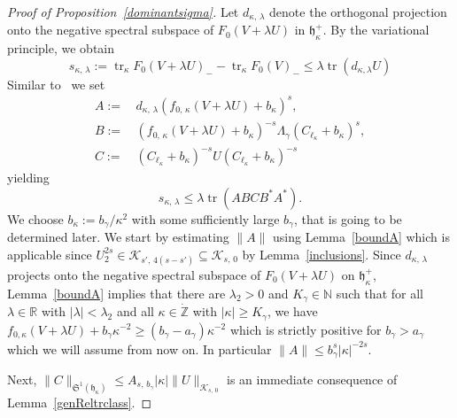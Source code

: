 \documentclass[AHL,Unicode,longabstracts,published]{cedram}
\DeclareMathOperator{\tr}{tr}
\newcommand*\nz{\mathbb{N}}
\newcommand*\gz{\mathbb{Z}}
\newcommand*\rz{\mathbb{R}}
\newcommand*\zp{\dot{\gz}}
\newcommand*\cK{\mathcal{K}}
\newcommand*\gh{\mathfrak{h}}
\newcommand*\gS{\mathfrak{S}}
\newcommand*\ghpk{{\gh^+_\kappa}}
\begin{document}
\begin{proof}[Proof of Proposition~\ref{dominantsigma}]
Let $d_{\kappa,\,\lambda}$ denote the orthogonal projection onto the negative spectral subspace of $F_0(V+\lambda U)$ in $\ghpk$. By the variational principle, we obtain
\begin{equation}
s_{\kappa,\,\lambda} := \tr_\kappa F_0(V+\lambda U)_- - \tr_\kappa F_0(V)_-
\leq \lambda\tr\left(d_{\kappa,\lambda}U\right)
\end{equation}
Similar to~\cite[Equation~(19)]{Iantchenkoetal1996} we set
\begin{equation}
\begin{split}
A :=\,&d_{\kappa,\,\lambda}\left(f_{0,\,\kappa}\left(V+\lambda U\right)+b_\kappa\right)^s,\\
B :=\,&\left(f_{0,\,\kappa}\left(V+\lambda U\right)+b_\kappa\right)^{-s}\Lambda_\gamma\left(C_{\ell_\kappa}+b_\kappa\right)^s,\\
C :=\,&\left(C_{\ell_\kappa}+b_\kappa\right)^{-s} U \left(C_{\ell_\kappa}+b_\kappa\right)^{-s}
\end{split}
\end{equation}
yielding
\[
s_{\kappa,\,\lambda}\leq\lambda \tr \left(ABCB^*A^*\right).
\]
We choose $ b_\kappa:=b_\gamma/\kappa^2$ with some sufficiently large $b_\gamma$, that is going to be determined later. We start by estimating $\|A\|$ using Lemma~\ref{boundA} which is applicable since $U_2^{2s}\in\cK_{s',\,4(s-s')}\subseteq\cK_{s,\,0}$ by Lemma~\ref{inclusions}. Since $d_{\kappa,\,\lambda}$ projects onto the negative spectral subspace of $F_0(V+\lambda U)$ on $\ghpk$, Lemma~\ref{boundA} implies that there are $\lambda_2>0$ and $K_\gamma\in\nz$ such that for all $\lambda\in\rz$ with $|\lambda|<\lambda_2$ and all $\kappa\in\zp$ with $|\kappa|\geq K_\gamma$, we have $f_{0,\kappa}(V+\lambda U)+b_\gamma\kappa^{-2}\geq(b_\gamma-a_\gamma)
\kappa^{-2}$ which is strictly positive for $b_\gamma>a_\gamma$ which we will assume from now on. In particular $\|A\|\leq b_\gamma^{s} |\kappa|^{-2s}$.

Next, $\|C\|_{\gS^1(\gh_{\kappa})} \leq A_{s,\,b_\gamma}|\kappa|\|U\|_{\cK_{s,\,0}}$ is an immediate consequence of Lemma~\ref{genReltrclass}.


\end{proof}
\end{document}

